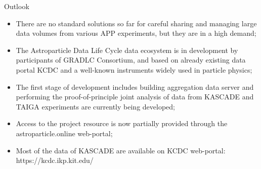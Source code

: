 \begin{frame}{Outlook}
    \begin{itemize}
      \setlength{\itemsep}{0pt}
        \item There are no standard solutions so far for careful sharing and managing large data volumes from various APP experiments, but they are in a high demand;
        \item The Astroparticle Data Life Cycle data ecosystem is in development by participants of GRADLC Consortium, and based on already existing data portal KCDC and a well-known instruments widely used in particle physics;
        \item The first stage of development includes building aggregation data server and performing the proof-of-principle joint analysis of data from KASCADE and TAIGA experiments are currently being developed;
        \item Access to the project resource is now partially provided through the astroparticle.online web-portal;
        \item Most of the data of KASCADE are available on KCDC web-portal: \textcolor{kit-blue70}{https://kcdc.ikp.kit.edu/}
    \end{itemize}
\end{frame}

